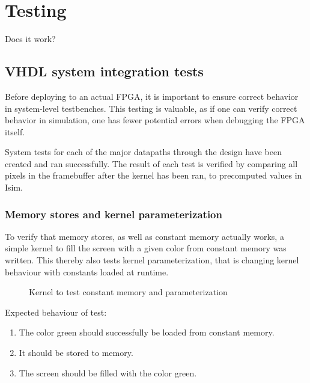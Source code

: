 \documentclass[../main/report.tex]{subfiles}
\begin{document}
\chapter{Testing}

Does it work?

\section{VHDL system integration tests}

Before deploying to an actual FPGA, it is important to ensure correct behavior in system-level testbenches.
This testing is valuable, as if one can verify correct behavior in simulation, one has fewer potential errors when debugging the FPGA itself.

System tests for each of the major datapaths through the design have been created and ran successfully.
The result of each test is verified by comparing all pixels in the framebuffer after the kernel has been ran, to precomputed values in Isim.

\subsection{Memory stores and kernel parameterization}

To verify that memory stores, as well as constant memory actually works, a simple kernel to fill the screen with a given color from constant memory was written.
This thereby also tests kernel parameterization, that is changing kernel behaviour with constants loaded at runtime.

\begin{figure}[H]
  \caption{Kernel to test constant memory and parameterization}
  \label{fig:test-kernel-parameterization}
\end{figure}

Expected behaviour of test:
\begin{enumerate}
  \item
    The color green should successfully be loaded from constant memory.
  \item
    It should be stored to memory.
  \item
    The screen should be filled with the color green.
\end{enumerate}
\end{document}
